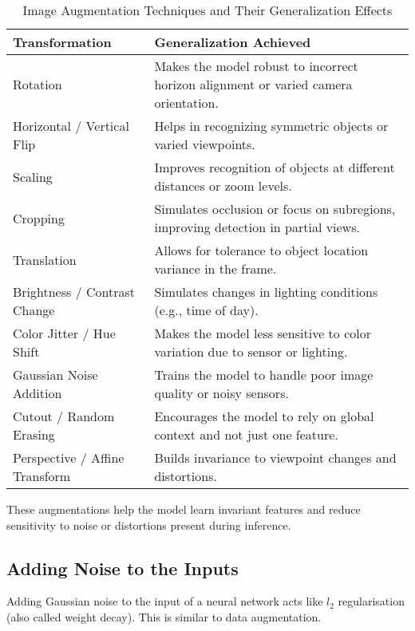 \begin{table}[h]
\centering
\begin{tabular}{|l|p{9cm}|}
\hline
\textbf{Transformation} & \textbf{Generalization Achieved} \\
\hline
Rotation & Makes the model robust to incorrect horizon alignment or varied camera orientation. \\
\hline
Horizontal / Vertical Flip & Helps in recognizing symmetric objects or varied viewpoints. \\
\hline
Scaling & Improves recognition of objects at different distances or zoom levels. \\
\hline
Cropping & Simulates occlusion or focus on subregions, improving detection in partial views. \\
\hline
Translation & Allows for tolerance to object location variance in the frame. \\
\hline
Brightness / Contrast Change & Simulates changes in lighting conditions (e.g., time of day). \\
\hline
Color Jitter / Hue Shift & Makes the model less sensitive to color variation due to sensor or lighting. \\
\hline
Gaussian Noise Addition & Trains the model to handle poor image quality or noisy sensors. \\
\hline
Cutout / Random Erasing & Encourages the model to rely on global context and not just one feature. \\
\hline
Perspective / Affine Transform & Builds invariance to viewpoint changes and distortions. \\
\hline
\end{tabular}
\caption{Image Augmentation Techniques and Their Generalization Effects}
\end{table}

These augmentations help the model learn invariant features and reduce sensitivity to noise or distortions present during inference.

\subsection{Adding Noise to the Inputs}

Adding Gaussian noise to the input of a neural network acts like $l_2$ regularisation (also called weight decay). This is similar to data augmentation.

